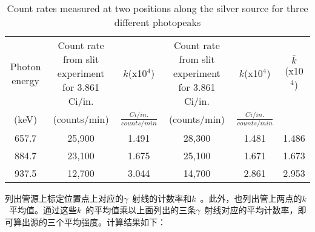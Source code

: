 \begin{table}
\centering
\caption{Count rates measured at two positions along the silver source for 	three different photopeaks}
\begin{tabular}[c]{cccccc}
\hline


\multirow{3}{2cm}{Photon energy} & \multirow{3}{3cm}{Count rate from  slit 	experiment for 3.861 Ci/in.} &  \multirow{3}{2cm}{$k$(x10$^4$)}& \multirow{3}{3cm}{Count rate from  slit experiment  for 3.861 Ci/in.} & \multirow{3}{2cm}{$k$(x10$^4$)}&  \multirow{3}{2cm}{$\overline{k}$ (x10$^4	$)} \\
\\
\\
(keV)& (counts/min) & $\frac{Ci/in. }{counts/min}$  & (counts/min)  & 
$\frac{Ci/in.}{counts/min}$ &   \\
\hline
657.7  &  25,900  &1.491  &28,300  &1.481  &1.486  \\
884.7  &  23,100  &1.675  &25,100  &1.671  &1.673  \\
937.5  &  12,700  &3.044  &14,700  &2.861  &2.953  \\
\hline
\end{tabular}
\end{table}

列出管源上标定位置点上对应的$\gamma$\ 射线的计数率和$k$\ 。此外，也列出管上两点的$k$\ 平均值。通过这些$k$\ 的平均值乘以上面列出的三条$\gamma$\ 射线对应的平均计数率，即可算出源的三个平均强度。计算结果如下：

